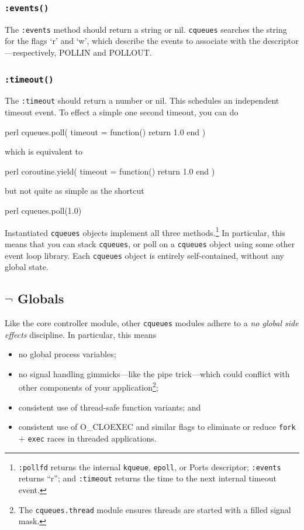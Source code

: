 \documentclass[11pt, oneside]{memoir}
\newcommand*{\cqueues}[0]{\texttt{cqueues}\xspace}
\newcommand*{\syscall}[1]{\texttt{#1}\xspace}
\newcommand*{\method}[1]{\texttt{#1}\xspace}
\newcommand*{\module}[1]{\texttt{#1}\xspace}
\begin{document}
\subsubsection[\method{object:events}]{\method{:events()}} The \method{:events} method should return a string or nil. \cqueues searches the string for the flags `r' and `w', which describe the events to associate with the descriptor---respectively, POLLIN and POLLOUT.

\subsubsection[\method{object:timeout}]{\method{:timeout()}} The \method{:timeout} should return a number or nil. This schedules an independent timeout event. To effect a simple one second timeout, you can do

\begin{code}{perl}
        cqueues.poll({ timeout = function() return 1.0 end })
\end{code}

which is equivalent to

\begin{code}{perl}
	coroutine.yield({ timeout = function() return 1.0 end })
\end{code}

but not quite as simple as the shortcut

\begin{code}{perl}
	cqueues.poll(1.0)
\end{code}

Instantiated \cqueues objects implement all three methods.\footnote{\method{:pollfd} returns the internal \syscall{kqueue}, \syscall{epoll}, or Ports descriptor; \method{:events} returns ``r''; and \method{:timeout} returns the time to the next internal timeout event.} In particular, this means that you can stack \cqueues, or poll on a \cqueues object using some other event loop library. Each \cqueues object is entirely self-contained, without any global state.

\subsection{$\lnot$ Globals}

Like the core controller module, other \cqueues modules adhere to a \emph{no global side effects} discipline. In particular, this means
\begin{itemize}
\item no global process variables;
\item no signal handling gimmicks---like the pipe trick---which could conflict with other components of your application\footnote{The \module{cqueues.thread} module ensures threads are started with a filled signal mask.};
\item consistent use of thread-safe function variants; and
\item consistent use of O\_CLOEXEC and similar flags to eliminate or reduce \syscall{fork} $+$ \syscall{exec} races in threaded applications.
\end{itemize}
\end{document}
